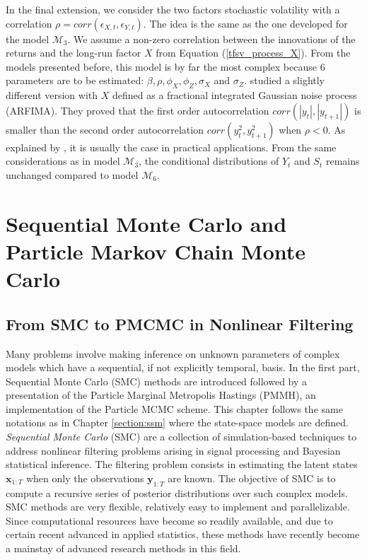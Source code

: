 \documentclass[11pt,a4,twosided,singlespacing,titlepagenumber=on]{scrreprt}
\numberwithin{equation}{chapter} %
\theoremstyle{remark}
\newcommand{\matr}[1]{\mathbf{#1}}
\begin{document}
In the final extension, we consider the two factors stochastic volatility with a correlation $\rho = corr(\epsilon_{X,t}, \epsilon_{Y,t})$. The idea is the same as the one developed for the model $\mathcal{M}_3$. We assume a non-zero correlation between the innovations of the returns and the long-run factor $X$ from Equation (\ref{tfsv_process_X}). From the models presented before, this model is by far the most complex because 6 parameters are to be estimated: $\beta, \rho, \phi_X, \phi_Z, \sigma_X$ and $\sigma_Z$. \cite{ruiz2008} studied a slightly different version with $X$ defined as a fractional integrated Gaussian noise process (ARFIMA). They proved that the first order autocorrelation $corr(|y_t|,|y_{t+1}|)$ is smaller than the second order autocorrelation $corr(y_t^2,y_{t+1}^2)$ when $\rho < 0$. As explained by \cite{cont2005}, it is usually the case in practical applications. From the same considerations as in model $\mathcal{M}_3$, the conditional distributions of $Y_t$ and $S_t$ remains unchanged compared to model $\mathcal{M}_6$.

\chapter{Sequential Monte Carlo and Particle Markov Chain Monte Carlo}
\label{section:pmcmc}
\section{From SMC to PMCMC in Nonlinear Filtering}
Many problems involve making inference on unknown parameters of complex models which have a sequential, if not explicitly temporal, basis. In the first part, Sequential Monte Carlo (SMC) methods are introduced followed by a presentation of the Particle Marginal Metropolis Hastings (PMMH), an implementation of the Particle MCMC scheme. This chapter follows the same notations as in Chapter \ref{section:ssm} where the state-space models are defined.\\

\textit{Sequential Monte Carlo} (SMC) are a collection of simulation-based techniques to address nonlinear filtering problems arising in signal processing and Bayesian statistical inference. The filtering problem consists in estimating the latent states $\matr{x}_{1:T}$ when only the observations $\matr{y}_{1:T}$ are known. The objective of SMC is to compute a recursive series of posterior distributions over such complex models. SMC methods are very flexible, relatively easy to implement and parallelizable. Since computational resources have become so readily available, and due to certain recent advanced in applied statistics, these methods have recently become a mainstay of advanced research methods in this field.\\
\end{document}

